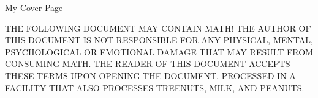 \documentclass{article}
\begin{document}
\pagestyle{empty}
\vspace*{\fill}
\begin{center}
  \begin{Huge}
    My Cover Page
  \end{Huge}
\end{center}
\vspace*{\fill}

\begin{small}
  \MakeUppercase{
    The following document may contain math!
    The author of this document is not responsible for any
    physical, mental, psychological or emotional damage that
    may result from consuming math.  The reader of this document
    accepts these terms upon opening the document.  Processed
    in a facility that also processes treenuts, milk, and peanuts.
  }
\end{small}
\vspace*{\fill}
\end{document}
